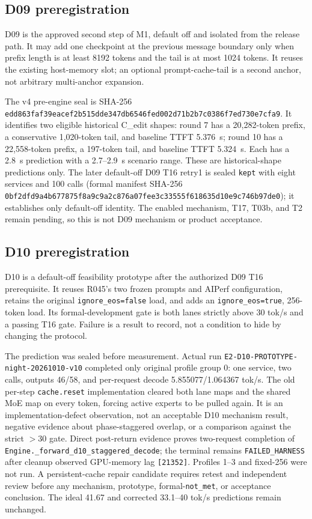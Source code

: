 \documentclass[11pt]{article}
\begin{document}
\subsection{D09 preregistration}

D09 is the approved second step of M1, default off and isolated from the release path. It may add one checkpoint at the previous message boundary only when prefix length is at least 8192 tokens and the tail is at most 1024 tokens. It reuses the existing host-memory slot; an optional prompt-cache-tail is a second anchor, not arbitrary multi-anchor expansion.

The v4 pre-engine seal is SHA-256 \texttt{edd863faf39eacef2b515dde347db6546fed002d71b2b7c0386f7ed730e7cfa9}. It identifies two eligible historical C\_edit shapes: round 7 has a 20,282-token prefix, a conservative 1,020-token tail, and baseline TTFT 5.376~s; round 10 has a 22,558-token prefix, a 197-token tail, and baseline TTFT 5.324~s. Each has a 2.8~s prediction with a 2.7--2.9~s scenario range. These are historical-shape predictions only. The later default-off D09 T16 retry1 is sealed \texttt{kept} with eight services and 100 calls (formal manifest SHA-256 \texttt{0bf2dfd9a4b677875f8a9c9a2c876a07fee3c33555f618635d10e9c746b97de0}); it establishes only default-off identity. The enabled mechanism, T17, T03b, and T2 remain pending, so this is not D09 mechanism or product acceptance.

\subsection{D10 preregistration}

D10 is a default-off feasibility prototype after the authorized D09 T16 prerequisite. It reuses R045's two frozen prompts and AIPerf configuration, retains the original \texttt{ignore\_eos=false} load, and adds an \texttt{ignore\_eos=true}, 256-token load. Its formal-development gate is both lanes strictly above 30 tok/s and a passing T16 gate. Failure is a result to record, not a condition to hide by changing the protocol.

The prediction was sealed before measurement. Actual run \texttt{E2-D10-PROTOTYPE-night-20261010-v10} completed only original profile group 0: one service, two calls, outputs 46/58, and per-request decode 5.855077/1.064367 tok/s. The old per-step \texttt{cache.reset} implementation cleared both lane maps and the shared MoE map on every token, forcing active experts to be pulled again. It is an implementation-defect observation, not an acceptable D10 mechanism result, negative evidence about phase-staggered overlap, or a comparison against the strict $>30$ gate. Direct post-return evidence proves two-request completion of \texttt{Engine.\_forward\_d10\_staggered\_decode}; the terminal remains \texttt{FAILED\_HARNESS} after cleanup observed GPU-memory lag \texttt{[21352]}. Profiles 1--3 and fixed-256 were not run. A persistent-cache repair candidate requires retest and independent review before any mechanism, prototype, formal-\texttt{not\_met}, or acceptance conclusion. The ideal 41.67 and corrected 33.1--40 tok/s predictions remain unchanged.
\end{document}
